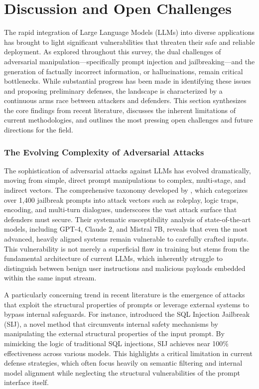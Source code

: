 \documentclass[11pt,a4paper]{article}
\begin{document}
\section{Discussion and Open Challenges}

The rapid integration of Large Language Models (LLMs) into diverse applications has brought to light significant vulnerabilities that threaten their safe and reliable deployment. As explored throughout this survey, the dual challenges of adversarial manipulation---specifically prompt injection and jailbreaking---and the generation of factually incorrect information, or hallucinations, remain critical bottlenecks. While substantial progress has been made in identifying these issues and proposing preliminary defenses, the landscape is characterized by a continuous arms race between attackers and defenders. This section synthesizes the core findings from recent literature, discusses the inherent limitations of current methodologies, and outlines the most pressing open challenges and future directions for the field.

\subsubsection{The Evolving Complexity of Adversarial Attacks}

The sophistication of adversarial attacks against LLMs has evolved dramatically, moving from simple, direct prompt manipulations to complex, multi-stage, and indirect vectors. The comprehensive taxonomy developed by \cite{Pathade_2025_LLMs}, which categorizes over 1,400 jailbreak prompts into attack vectors such as roleplay, logic traps, encoding, and multi-turn dialogues, underscores the vast attack surface that defenders must secure. Their systematic susceptibility analysis of state-of-the-art models, including GPT-4, Claude 2, and Mistral 7B, reveals that even the most advanced, heavily aligned systems remain vulnerable to carefully crafted inputs. This vulnerability is not merely a superficial flaw in training but stems from the fundamental architecture of current LLMs, which inherently struggle to distinguish between benign user instructions and malicious payloads embedded within the same input stream.

A particularly concerning trend in recent literature is the emergence of attacks that exploit the structural properties of prompts or leverage external systems to bypass internal safeguards. For instance, \cite{Zhao_2024_SQL} introduced the SQL Injection Jailbreak (SIJ), a novel method that circumvents internal safety mechanisms by manipulating the external structural properties of the input prompt. By mimicking the logic of traditional SQL injections, SIJ achieves near 100\% effectiveness across various models. This highlights a critical limitation in current defense strategies, which often focus heavily on semantic filtering and internal model alignment while neglecting the structural vulnerabilities of the prompt interface itself.
\end{document}
